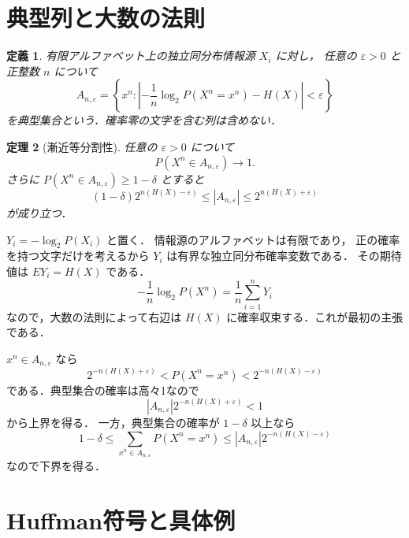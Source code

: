 \documentclass[a5paper,10pt,onecolumn]{jsarticle}
\makeatletter
\theoremstyle{mathnotetheorem}
\newtheorem{theorem}{定理}[section]
\newtheorem{definition}[theorem]{定義}
\renewcommand{\proofname}{証明}
\renewenvironment{proof}[1][\proofname]{%
  \par\pushQED{\qed}\normalfont\topsep4\p@\@plus2\p@\relax
  \trivlist\item[\hskip\labelsep\bfseries #1]\ignorespaces
}{\popQED\endtrivlist\@endpefalse}
\makeatother
\begin{document}
\section{典型列と大数の法則}

\begin{definition}
有限アルファベット上の独立同分布情報源 $X_i$ に対し，
任意の $\varepsilon>0$ と正整数 $n$ について
\[
 A_{n,\varepsilon}
 =\left\{x^n:
 \left|-\frac1n\log_2P(X^n=x^n)-H(X)\right|
 <\varepsilon\right\}
\]
を典型集合という．確率零の文字を含む列は含めない．
\end{definition}

\begin{theorem}[漸近等分割性]\label{thm:aep}
任意の $\varepsilon>0$ について
\[
 P(X^n\in A_{n,\varepsilon})\longrightarrow1.
\]
さらに $P(X^n\in A_{n,\varepsilon})\ge1-\delta$ とすると
\[
 (1-\delta)2^{n(H(X)-\varepsilon)}
 \le |A_{n,\varepsilon}|
 \le2^{n(H(X)+\varepsilon)}
\]
が成り立つ．
\end{theorem}
\begin{proof}
$Y_i=-\log_2P(X_i)$ と置く．
情報源のアルファベットは有限であり，
正の確率を持つ文字だけを考えるから
$Y_i$ は有界な独立同分布確率変数である．
その期待値は $EY_i=H(X)$ である．
\[
 -\frac1n\log_2P(X^n)
 =\frac1n\sum_{i=1}^nY_i
\]
なので，大数の法則によって右辺は
$H(X)$ に確率収束する．これが最初の主張である．

$x^n\in A_{n,\varepsilon}$ なら
\[
 2^{-n(H(X)+\varepsilon)}
 <P(X^n=x^n)
 <2^{-n(H(X)-\varepsilon)}
\]
である．典型集合の確率は高々1なので
\[
 |A_{n,\varepsilon}|
 2^{-n(H(X)+\varepsilon)}<1
\]
から上界を得る．
一方，典型集合の確率が $1-\delta$ 以上なら
\[
 1-\delta
 \le\sum_{x^n\in A_{n,\varepsilon}}P(X^n=x^n)
 \le |A_{n,\varepsilon}|2^{-n(H(X)-\varepsilon)}
\]
なので下界を得る．
\end{proof}

\section{Huffman符号と具体例}
\end{document}
